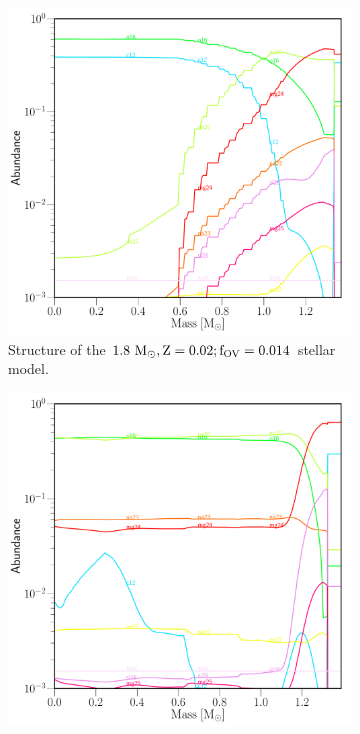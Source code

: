 \documentclass[../../main/thesis_msc.tex]{subfiles}
\begin{document}
\begin{figure}
\centering
\begin{subfigure}[b]{.45\linewidth}
\includegraphics[width=\textwidth]{../figures/chapter4/1p8_logRho9_abun.pdf}
\caption{Structure of the $1.8 \rm \ M_{\odot},  Z=0.02;f_{OV}=0.014$ stellar model.}\label{fig:abun_a}
\hfill
\end{subfigure}
\hfill
\begin{subfigure}[b]{.45\linewidth}
\includegraphics[width=\textwidth]{../figures/chapter4/2p5_logRho_9_abun.pdf}

\end{subfigure}
\end{figure}
\end{document}
